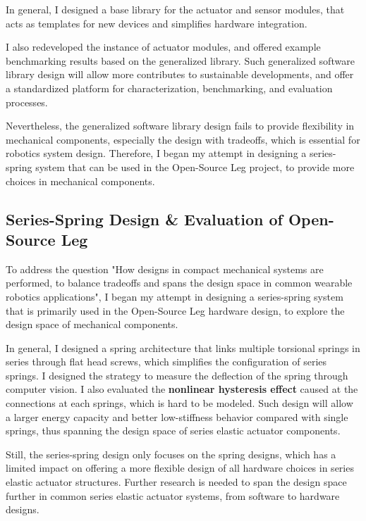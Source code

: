\documentclass[8pt]{article}
\begin{document}
    In general, I designed a base library for the actuator and sensor modules, that acts as templates for new devices and simplifies hardware integration.
    
    I also redeveloped the instance of actuator modules, and offered example benchmarking results based on the generalized library. Such generalized software library design will allow more contributes to sustainable developments, and offer a standardized platform for characterization, benchmarking, and evaluation processes. 

    Nevertheless, the generalized software library design fails to provide flexibility in mechanical components, especially the design with tradeoffs, which is essential for robotics system design. Therefore, I began my attempt in designing a series-spring system that can be used in the Open-Source Leg project, to provide more choices in mechanical components.

    
    \subsection{Series-Spring Design \& Evaluation of Open-Source Leg}  \label{sec:series-spring}

    
    To address the question "How designs in compact mechanical systems are performed, to balance tradeoffs and spans the design space in common wearable robotics applications", I began my attempt in designing a series-spring system that is primarily used in the Open-Source Leg hardware design, to explore the design space of mechanical components.

    In general, I designed a spring architecture that links multiple torsional springs in series through flat head screws, which simplifies the configuration of series springs. I designed the strategy to measure the deflection of the spring through computer vision. I also evaluated the \textbf{nonlinear hysteresis effect} caused at the connections at each springs\cite{nonlinearHysteresis}, which is hard to be modeled. Such design will allow a larger energy capacity and better low-stiffness behavior compared with single springs, thus spanning the design space of series elastic actuator components. 


    Still, the series-spring design only focuses on the spring designs, which has a limited impact on offering a more flexible design of all hardware choices in series elastic actuator structures. Further research is needed to span the design space further in common series elastic actuator systems, from software to hardware designs.
    
\end{document}
